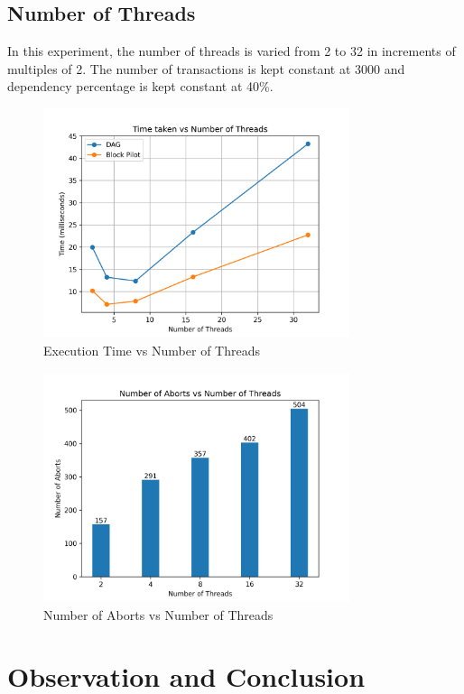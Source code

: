 \documentclass[12pt]{article}
\begin{document}
\subsection{Number of Threads}
In this experiment, the number of threads is varied from 2 to 32 in increments of multiples of 2. 
The number of transactions is kept constant at 3000 and dependency percentage is kept constant at 40\%.
\begin{figure}[h]
    \centering
    \includegraphics[width=0.8\textwidth]{images/numThreads_vs_Time.png}
    \caption{Execution Time vs Number of Threads}
    \label{fig:numThreads_vs_Time}
\end{figure}

\begin{figure}[h]
    \centering
    \includegraphics[width=0.8\textwidth]{images/numThreads_vs_Aborts.png}
    \caption{Number of Aborts vs Number of Threads}
    \label{fig:numThreads_vs_Aborts}
\end{figure}

\section{Observation and Conclusion}
\end{document}
